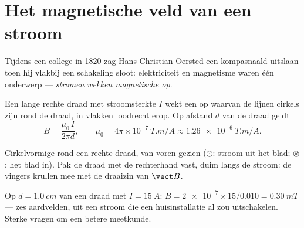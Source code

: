 \section{Het magnetische veld van een stroom}

\begin{remark}[Oersted, 1820]\label{rem:g11:magnetic-fields:oersted}
Tijdens een college in 1820 zag Hans Christian Oersted een kompasnaald
uitslaan toen hij vlakbij een schakeling sloot: elektriciteit en
magnetisme waren één onderwerp --- \emph{stromen wekken magnetische
 op}.
\end{remark}

\begin{proposition}\label{prop:g11:magnetic-fields:wire}
Een lange rechte draad met stroomsterkte $I$ wekt een  op waarvan de
lijnen cirkels zijn rond de draad, in vlakken loodrecht erop. Op afstand
$d$ van de draad geldt
\[
B = \frac{\mu_0\, I}{2\pi d},
\qquad \mu_0 = 4\pi\times 10^{-7}\ \unit{T.m/A} \approx \qty{1.26e-6}{T.m/A}.
\]
\end{proposition}
\admitted

\begin{omfigure}
\qquad\qquad
{}

{\small Cirkelvormige  rond een rechte draad, van voren gezien
($\odot$: stroom uit het blad; $\otimes$: het blad in). Pak de draad met
de rechterhand vast, duim langs de stroom: de vingers krullen mee met de
draaizin van $\vect B$.}
\end{omfigure}

\begin{example}\label{ex:g11:magnetic-fields:wire}
Op $d = \qty{1.0}{cm}$ van een draad met $I = \qty{15}{A}$:
$B = \num{2e-7} \times 15 / 0.010 = \qty{0.30}{mT}$ --- zes aardvelden,
uit een stroom die een huisinstallatie al zou uitschakelen. Sterke 
vragen om een betere meetkunde.
\end{example}

